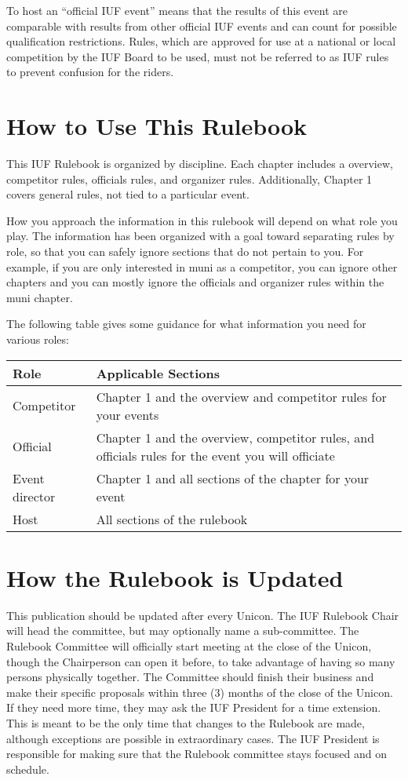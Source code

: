 To host an ``official IUF event'' means that the results of this event are comparable with results from other official IUF events and can count for possible qualification restrictions.
Rules, which are approved for use at a national or local competition by the IUF Board to be used, must not be referred to as IUF rules to prevent confusion for the riders.

\section{How to Use This Rulebook}

This IUF Rulebook is organized by discipline.  Each chapter includes a overview, competitor rules, officials rules, and organizer rules.  Additionally, Chapter 1 covers general rules, not tied to a particular event. 

How you approach the information in this rulebook will depend on what role you play.  The information has been organized with a goal toward separating rules by role, so that you can safely ignore sections that do not pertain to you.  For example, if you are only interested in muni as a competitor, you can ignore other chapters and you can mostly ignore the officials and organizer rules within the muni chapter.

The following table gives some guidance for what information you need for various roles:

\begin{longtable}{|l|p{8cm}|}
\hline
\textbf{Role} & \textbf{Applicable Sections} \\
\hline
Competitor & Chapter 1 and the overview and competitor rules for your events\\
\hline
Official & Chapter 1 and the overview, competitor rules, and officials rules for the event you will officiate\\
\hline
Event director & Chapter 1 and all sections of the chapter for your event \\
\hline
Host & All sections of the rulebook\\
\hline
\end{longtable}

\section{How the Rulebook is Updated}

This publication should be updated after every Unicon.
The IUF Rulebook Chair will head the committee, but may optionally name a sub-committee.
The Rulebook Committee will officially start meeting at the close of the Unicon, though the Chairperson can open it before, to take advantage of having so many persons physically together.
The Committee should finish their business and make their specific proposals within three (3) months of the close of the Unicon.
If they need more time, they may ask the IUF President for a time extension.
This is meant to be the only time that changes to the Rulebook are made, although exceptions are possible in extraordinary cases.
The IUF President is responsible for making sure that the Rulebook committee stays focused and on schedule.

